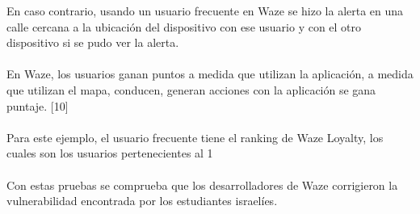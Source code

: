 En caso contrario, usando un usuario frecuente en Waze se hizo la alerta en una calle cercana a la ubicación del dispositivo con ese usuario y con el otro dispositivo si se pudo ver la alerta.
\\\\
En Waze, los usuarios ganan puntos a medida que utilizan la aplicación, a medida que utilizan el mapa, conducen, generan acciones con la aplicación se gana puntaje. [10]
\\\\
Para este ejemplo, el usuario frecuente tiene el ranking de Waze Loyalty, los cuales son los usuarios pertenecientes al 1%
\\\\
Con estas pruebas se comprueba que los desarrolladores de Waze corrigieron la vulnerabilidad encontrada por los estudiantes israelíes.